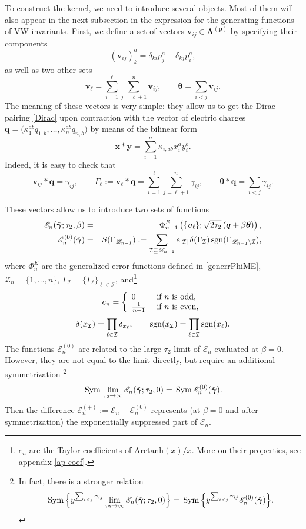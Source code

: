 \documentclass[12pt,letterpaper]{JHEP3}
\def\bea{\begin{eqnarray}}
\def\eea{\end{eqnarray}}
\def\be{\begin{equation}}
\def\ee{\end{equation}}
\def\Sym{\,{\rm Sym}\, }
\newcommand{\sgn}{{\rm sgn}}
\def\({\left(}
\def\){\right)}
\newcommand{\cI}{\mathcal{I}}
\def\Ev{\mathscr{E}}
\def\Zv{\mathscr{Z}}
\newcommand{\bfv}{{\boldsymbol v}}
\newcommand{\bfp}{{\boldsymbol p}}
\newcommand{\bfq}{{\boldsymbol q}}
\newcommand{\bfx}{{\boldsymbol x}}
\newcommand{\bfy}{{\boldsymbol y}}
\newcommand{\bftet}{{\boldsymbol \theta}}
\newcommand{\bfLam}{{\boldsymbol \Lambda}}
\newcommand{\bfgam}{{\boldsymbol \gamma}}
\def\bfhgam{\hat\bfgam}
\def\Efrf{\Ev^{(0)}}
\def\Er{\Ev}
\def\Eprf{\Ev^{(+)}}
\begin{document}
To construct the kernel, we need to introduce several objects.
Most of them will also appear in the next subsection in the expression for the generating functions of VW invariants.
First, we define a set of vectors $\bfv_{ij}\in\bfLam^{(\bfp)}$ by specifying their components
\be 
(\bfv_{ij})_k^a=\delta_{ki} p_j^a-\delta_{kj} p_i^a,
\label{def-vij}
\ee
as well as two other sets
\be
\bfv_\ell= \sum_{i=1}^\ell\sum_{j=\ell+1}^n\bfv_{ij},
\qquad
\bftet = \sum_{i<j} \bfv_{ij}.
\label{def-bfvk}
\ee
The meaning of these vectors is very simple: they allow us to get the Dirac pairing \eqref{Dirac} upon contraction with 
the vector of electric charges 
$\bfq=\bigl(\kappa_1^{ab} q_{1,b} ,\dots ,\kappa_n^{ab}q_{n,b}\bigr)$ 
by means of the bilinear form
\be
\bfx\ast\bfy=\sum_{i=1}^n \kappa_{i,ab}x_i^a y_i^b.
\label{biform}
\ee
Indeed, it is easy to check that 
\be
\bfv_{ij}\ast\bfq=\gamma_{ij},
\qquad 
\Gamma_\ell:=\bfv_\ell \ast\bfq=\sum_{i=1}^\ell\sum_{j=\ell+1}^n\gamma_{ij},
\qquad
\bftet\ast\bfq=\sum_{i<j}\gamma_{ij}.
\label{defGammae}
\ee

These vectors allow us to introduce two sets of functions
\bea
\Er_n(\bfhgam;\tau_2,\beta)&=& \Phi^E_{n-1}\(\{ \bfv_{\ell}\};\sqrt{2\tau_2}\,(\bfq+\beta\bftet )\),
\label{Erefsim}
\\
\Efrf_n(\bfhgam)&=& S(\Gamma_{\Zv_{n-1}}):=
\sum_{\cI\subseteq \Zv_{n-1}} e_{|\cI|}\,\delta(\Gamma_\cI)\, 
\sgn(\Gamma_{\Zv_{n-1}\setminus \cI}),
\label{defSlin}
\eea
where 
$\Phi^E_n$ are the generalized error functions defined in \eqref{generrPhiME},
$\Zv_{n}=\{1,\dots,n\}$, $\Gamma_\cI=\{\Gamma_\ell\}_{\ell\in\cI}$, and\footnote{$e_n$ 
	are the Taylor coefficients of $\mbox{Arctanh}(x)/x$. More on their properties, see appendix \ref{ap-coef}.}
\be
e_n=\left\{\begin{array}{ll}
	0 & \mbox{\rm if $n$ is odd},
	\\
	\frac{1}{n+1}\ & \mbox{\rm if $n$ is even},
\end{array}\right.
\label{def-genthm}
\ee  
\be 
\delta(x_\cI)=\prod_{\ell\in\cI}\delta_{x_\ell},
\qquad
\sgn(x_\cI)=\prod_{\ell\in \cI}\sgn(x_\ell).
\label{def-delta}
\ee
The functions $\Efrf_n$ are related to the large $\tau_2$ limit of $\Er_n$ evaluated at $\beta=0$.
However, they are not equal to the limit directly, but require an additional symmetrization \cite{Alexandrov:2024jnu}\footnote{In fact, 
	there is a stronger relation \cite{Alexandrov:2025sig}
	$$ 
	\Sym\Bigl\{y^{\sum_{i<j} \gamma_{ij}}\lim_{\tau_2\to\infty}\Er_n(\bfhgam;\tau_2,0)\Bigr\}
	=\Sym\Bigl\{y^{\sum_{i<j} \gamma_{ij}}\Efrf_n(\bfhgam) \Bigr\}.
	$$
	\label{foot-limy}}
\be 
\Sym\lim_{\tau_2\to\infty}\Er_n(\bfhgam;\tau_2,0)=\Sym\Efrf_n(\bfhgam) .
\label{Efref-lim}
\ee
Then the difference $\Eprf_n:=\Er_n-\Efrf_n$ represents (at $\beta=0$ and after symmetrization) 
the exponentially suppressed part of $\Er_n$.
\end{document}
